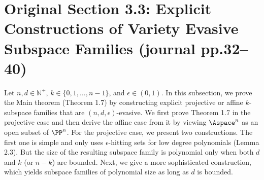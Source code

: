 \section*{Original Section 3.3: Explicit Constructions of Variety Evasive Subspace Families (journal pp.32--40)}
Let $n,d\in\mathbb N^+$, $k\in\{0,1,\ldots,n-1\}$, and $\epsilon\in(0,1)$. In this subsection, we prove the Main theorem (Theorem 1.7) by constructing explicit projective or affine $k$-subspace families that are $(n,d,\epsilon)$-evasive.
We first prove Theorem 1.7 in the projective case and then derive the affine case from it by viewing $\Aspace^n$ as an open subset of $\PP^n$. For the projective case, we present two constructions. The first one is simple and only uses $\epsilon$-hitting sets for low degree polynomials (Lemma 2.3). But the size of the resulting subspace family is polynomial only when both $d$ and $k$ (or $n-k$) are bounded. Next, we give a more sophisticated construction, which yields subspace families of polynomial size as long as $d$ is bounded.
